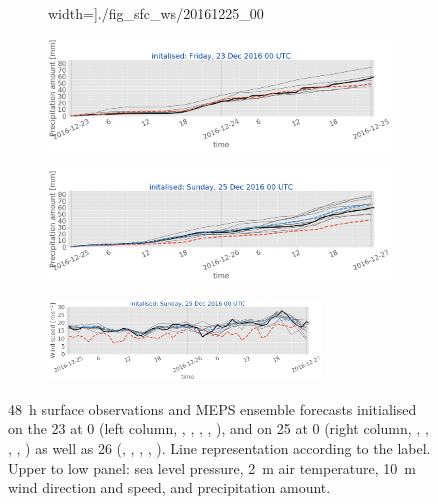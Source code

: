 \begin{figure}[H]
\begin{subfigure}[b]{0.49\textwidth}
		width=\textwidth]{./fig_sfc_ws/20161225_00}
		\caption{}\label{fig:res:sfc_ws25}
	\end{subfigure}
	\begin{subfigure}[b]{0.49\textwidth}
		\includegraphics[trim={0.cm 3.6cm 0cm 0cm},clip,
		width=\textwidth]{./fig_sfc_precip/20161223_00}
		\caption{}\label{fig:res:sfc_precip23}
	\end{subfigure}
	\begin{subfigure}[b]{0.49\textwidth}
		\includegraphics[trim={0.cm 3.6cm 0cm 0cm},clip,
		width=\textwidth]{./fig_sfc_precip/20161225_00}
		\caption{}\label{fig:res:sfc_precip25}
	\end{subfigure}
	
	\begin{subfigure}[b]{\textwidth}
		\centering
		\includegraphics[trim={5.5cm 0cm 5.cm 17.2cm},clip,
		width=0.8\textwidth]{./fig_sfc_ws/20161225_00}
	\end{subfigure}
	\caption{\SI{48}{\hour} surface observations and MEPS ensemble forecasts initialised on the \SI{23}{\dec} at \SI{0}{\UTC} (left column, \protect{}, \protect{}, \protect{}, \protect{}, \protect{}), and on \SI{25}{\dec} at \SI{0}{\UTC} (right column, \protect{}, \protect{}, \protect{}, \protect{}, \protect{}) as well as \SI{26}{\dec} (\protect{}, \protect{}, \protect{}, \protect{}, \protect{}). Line representation according to the label. Upper to low panel: sea level pressure, \SI{2}{\metre} air temperature, \SI{10}{\metre} wind direction and speed, and precipitation amount. }\label{fig:res:sfc_obs_meps}
\end{figure}
